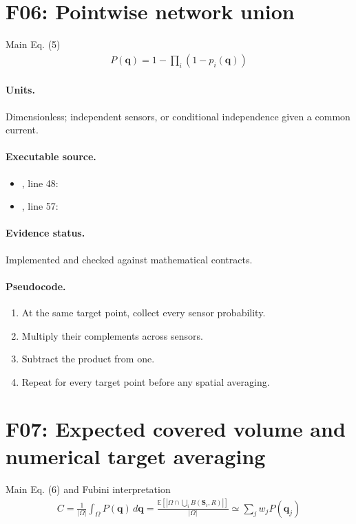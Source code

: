 \documentclass[10pt]{article}
\begin{document}
\section*{F06: Pointwise network union}
Main Eq. (5)
\begin{gather*}P(\mathbf q)=1-\prod_i(1-p_i(\mathbf q))\end{gather*}
\paragraph{Units.} Dimensionless; independent sensors, or conditional independence given a common current.
\paragraph{Executable source.}
\begin{itemize}[leftmargin=*]
\item {}, line 48: 
\item {}, line 57: 
\end{itemize}
\paragraph{Evidence status.} Implemented and checked against mathematical contracts.
\paragraph{Pseudocode.}
\begin{enumerate}[leftmargin=*]
\item At the same target point, collect every sensor probability.
\item Multiply their complements across sensors.
\item Subtract the product from one.
\item Repeat for every target point before any spatial averaging.
\end{enumerate}
\newpage
\section*{F07: Expected covered volume and numerical target averaging}
Main Eq. (6) and Fubini interpretation
\begin{gather*}C=\frac1{|\Omega|}\int_\Omega P(\mathbf q)\,d\mathbf q=\frac{\mathbb E[|\Omega\cap\bigcup_i B(\mathbf S_i,R)|]}{|\Omega|}\simeq\sum_jw_jP(\mathbf q_j)\end{gather*}
\end{document}
